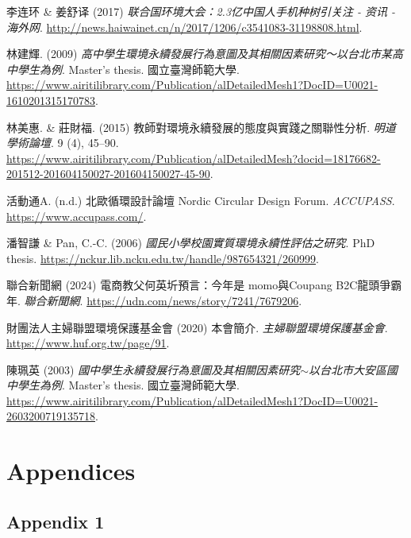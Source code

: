 \documentclass[
  letterpaper,
  DIV=11,
  numbers=noendperiod]{scrartcl}
\newlength{\cslhangindent}
\newenvironment{CSLReferences}[2] %
 {\begin{list}{}{%
  \setlength{\itemindent}{0pt}
  \setlength{\leftmargin}{0pt}
  \setlength{\parsep}{0pt}
  \ifodd #1
   \setlength{\leftmargin}{\cslhangindent}
   \setlength{\itemindent}{-1\cslhangindent}
  \fi
  \setlength{\itemsep}{#2\baselineskip}}}
 {\end{list}}
\begin{document}
\begin{CSLReferences}{0}{1}
李连环 \& 姜舒译 (2017) \emph{联合国环境大会：2.3亿中国人手机种树引关注
- 资讯 - 海外网}.
\url{http://news.haiwainet.cn/n/2017/1206/c3541083-31198808.html}.

林建輝. (2009)
\emph{{高中學生環境永續發展行為意圖及其相關因素研究～以台北市某高中學生為例}}.
Master's thesis. 國立臺灣師範大學.
\url{https://www.airitilibrary.com/Publication/alDetailedMesh1?DocID=U0021-1610201315170783}.

林美惠. \& 莊財福. (2015) {教師對環境永續發展的態度與實踐之關聯性分析}.
\emph{明道學術論壇}. 9 (4), 45--90.
\url{https://www.airitilibrary.com/Publication/alDetailedMesh?docid=18176682-201512-201604150027-201604150027-45-90}.

活動通A. (n.d.) 北歐循環設計論壇 {Nordic Circular Design Forum}.
\emph{ACCUPASS}. \url{https://www.accupass.com/}.

潘智謙 \& Pan, C.-C. (2006)
\emph{\emph{國民小學校園實質環境永續性評估之研究}}. PhD thesis.
\url{https://nckur.lib.ncku.edu.tw/handle/987654321/260999}.

聯合新聞網 (2024) {電商教父何英圻預言：今年是 momo與Coupang
B2C龍頭爭霸年}. \emph{聯合新聞網}.
\url{https://udn.com/news/story/7241/7679206}.

財團法人主婦聯盟環境保護基金會 (2020) {本會簡介}.
\emph{主婦聯盟環境保護基金會}. \url{https://www.huf.org.tw/page/91}.

陳珮英 (2003)
\emph{{國中學生永續發展行為意圖及其相關因素研究{\(\sim\)}以台北市大安區國中學生為例}}.
Master's thesis. 國立臺灣師範大學.
\url{https://www.airitilibrary.com/Publication/alDetailedMesh1?DocID=U0021-2603200719135718}.

\end{CSLReferences}

\newpage

\section{Appendices}\label{appendices}

\subsection{Appendix 1}\label{appendix-1}
\end{document}
